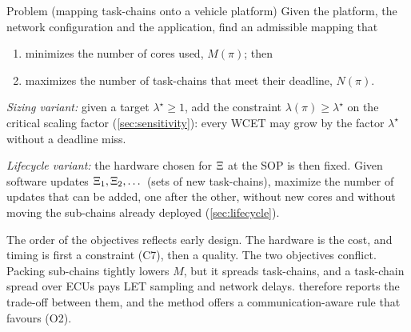 \begin{keybox}{Problem (mapping task-chains onto a vehicle platform)}
Given the platform, the network configuration and the application, find
an admissible mapping that
\begin{enumerate}[label=(O\arabic*),leftmargin=2.2em]
\item minimizes the number of cores used, $M(\pi)$; then
\item maximizes the number of task-chains that meet their deadline,
$N(\pi)$.
\end{enumerate}
\emph{Sizing variant:} given a target $\lambda^\star\ge1$, add the
constraint $\lambda(\pi)\ge\lambda^\star$ on the critical scaling factor
(\cref{sec:sensitivity}): every WCET may grow by the factor $\lambda^\star$
without a deadline miss.

\emph{Lifecycle variant:} the hardware chosen for $\Xi$ at the SOP is
then fixed. Given software updates $\Xi_1,\Xi_2,\dots$ (sets of
new task-chains), maximize the number of updates that can be added, one
after the other, without new cores and without moving the sub-chains
already deployed (\cref{sec:lifecycle}).
\end{keybox}

The order of the objectives reflects early design. The hardware is the
cost, and timing is first a constraint (C7), then a quality. The two
objectives conflict. Packing sub-chains tightly lowers $M$, but it spreads
task-chains, and a task-chain spread over ECUs pays LET sampling and
network delays.  therefore reports the trade-off
between them, and the method offers a communication-aware rule that
favours (O2).

